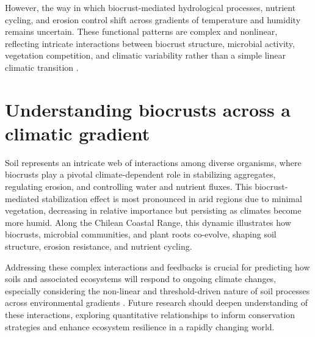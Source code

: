 However, the way in which biocrust-mediated hydrological processes, nutrient cycling, and erosion control shift across gradients of temperature and humidity remains uncertain. These functional patterns are complex and nonlinear, reflecting intricate interactions between biocrust structure, microbial activity, vegetation competition, and climatic variability rather than a simple linear climatic transition \citep{Bernhard2018,RiverasMunoz2025}.

\section{Understanding biocrusts across a climatic gradient}
\label{sec:BiocrustClimate}

Soil represents an intricate web of interactions among diverse organisms, where biocrusts play a pivotal climate-dependent role in stabilizing aggregates, regulating erosion, and controlling water and nutrient fluxes. This biocrust-mediated stabilization effect is most pronounced in arid regions due to minimal vegetation, decreasing in relative importance but persisting as climates become more humid. Along the Chilean Coastal Range, this dynamic illustrates how biocrusts, microbial communities, and plant roots co-evolve, shaping soil structure, erosion resistance, and nutrient cycling.

Addressing these complex interactions and feedbacks is crucial for predicting how soils and associated ecosystems will respond to ongoing climate changes, especially considering the non-linear and threshold-driven nature of soil processes across environmental gradients \citep{Bernhard2018,Wang2014}. Future research should deepen understanding of these interactions, exploring quantitative relationships to inform conservation strategies and enhance ecosystem resilience in a rapidly changing world.


